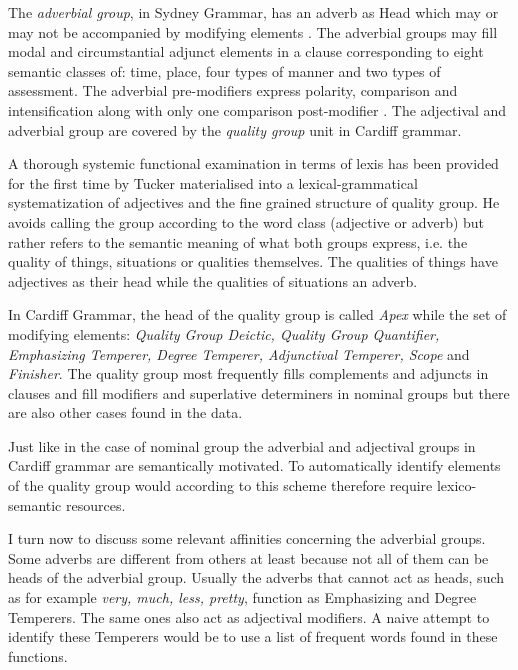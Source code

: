 	The \textit{adverbial group}, in Sydney Grammar, has an adverb as Head which may or may not be accompanied by modifying elements \citep[419]{Halliday2013}. The adverbial groups may fill modal and circumstantial adjunct elements in a clause corresponding to eight semantic classes of: time, place, four types of manner and two types of assessment. The adverbial pre-modifiers express polarity, comparison and intensification along with only one comparison post-modifier \citep[420--421]{Halliday2013}. The adjectival and adverbial group are covered by the \textit{quality group} unit in Cardiff grammar.
    
	A thorough systemic functional examination in terms of lexis has been provided for the first time by Tucker \citet{Tucker1997,Tucker1998} materialised into a lexical-grammatical systematization of adjectives and the fine grained structure of quality group. He avoids calling the group according to the word class (adjective or adverb) but rather refers to the semantic meaning of what both groups express, i.e. the quality of things, situations or qualities themselves. The qualities of things have adjectives as their head while the qualities of situations an adverb.       
	
	In Cardiff Grammar, the head of the quality group is called \textit{Apex} while the set of modifying elements: \textit{Quality Group Deictic, Quality Group Quantifier, Emphasizing Temperer, Degree Temperer, Adjunctival Temperer, Scope} and \textit{Finisher}. The quality group most frequently fills complements and adjuncts in clauses and fill modifiers and superlative determiners in nominal groups but there are also other cases found in the data. 
	
	Just like in the case of nominal group the adverbial and adjectival groups in Cardiff grammar are semantically motivated. To automatically identify elements of the quality group would according to this scheme therefore require lexico-semantic resources.
    
    I turn now to discuss some relevant affinities concerning the adverbial groups. Some adverbs are different from others at least because not all of them can be heads of the adverbial group. Usually the adverbs that cannot act as heads, such as for example \textit{very, much, less, pretty}, function as Emphasizing and Degree Temperers. The same ones also act as adjectival modifiers. A naive attempt to identify these Temperers would be to use a list of frequent words found in these functions.
    
